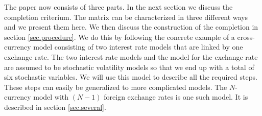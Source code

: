 \documentclass[11pt, a4paper]{article}
\begin{document}
The paper now consists of three parts. In the next section we discuss the completion criterium. The matrix can be characterized in three different ways and we present them here. We then discuss the construction of the completion in section \ref{sec.procedure}. We do this by following the concrete example of a cross-currency model consisting of two interest rate models that are linked by one exchange rate. The two interest rate models and the model for the exchange rate are assumed to be stochastic volatility models so that we end up with a total of six stochastic variables. We will use this model to describe all the required steps. These steps can easily be generalized to more complicated models. The $N$-currency model with $(N-1)$ foreign exchange rates is one such model. It is described in section \ref{sec.several}. 
\end{document}
